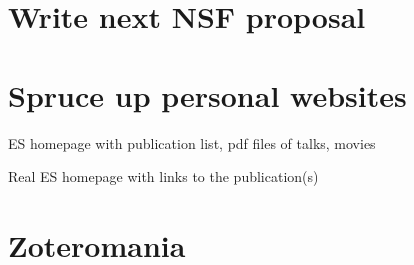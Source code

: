 \section{Write next NSF proposal }

\section{Spruce up personal websites}

ES homepage with publication list, pdf files of talks, movies

Real ES homepage with links to the publication(s)

\section{Zoteromania}

